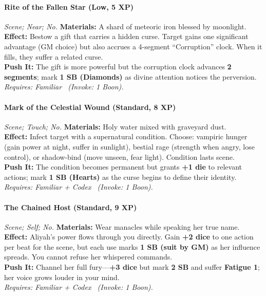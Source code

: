 \paragraph{Rite of the Fallen Star (Low, 5 XP)} \emph{Scene; Near; No.}
\textbf{Materials:} A shard of meteoric iron blessed by moonlight.\\
\textbf{Effect:} Bestow a gift that carries a hidden curse. Target gains one significant advantage (GM choice) but also accrues a 4-segment ``Corruption'' clock. When it fills, they suffer a related curse.\\
\textbf{Push It:} The gift is more powerful but the corruption clock advances \textbf{2 segments}; mark \textbf{1 SB (Diamonds)} as divine attention notices the perversion.\\
\emph{Requires: Familiar \ (\textit{Invoke:} 1 Boon).}

\paragraph{Mark of the Celestial Wound (Standard, 8 XP)} \emph{Scene; Touch; No.}
\textbf{Materials:} Holy water mixed with graveyard dust.\\
\textbf{Effect:} Infect target with a supernatural condition. Choose: vampiric hunger (gain power at night, suffer in sunlight), bestial rage (strength when angry, lose control), or shadow-bind (move unseen, fear light). Condition lasts scene.\\
\textbf{Push It:} The condition becomes permanent but grants \textbf{+1 die} to relevant actions; mark \textbf{1 SB (Hearts)} as the curse begins to define their identity.\\
\emph{Requires: Familiar + Codex \ (\textit{Invoke:} 1 Boon).}

\paragraph{The Chained Host (Standard, 9 XP)} \emph{Scene; Self; No.}
\textbf{Materials:} Wear manacles while speaking her true name.\\
\textbf{Effect:} Aliyah's power flows through you directly. Gain \textbf{+2 dice} to one action per beat for the scene, but each use marks \textbf{1 SB (suit by GM)} as her influence spreads. You cannot refuse her whispered commands.\\
\textbf{Push It:} Channel her full fury—\textbf{+3 dice} but mark \textbf{2 SB} and suffer \textbf{Fatigue 1}; her voice grows louder in your mind.\\
\emph{Requires: Familiar + Codex \ (\textit{Invoke:} 1 Boon).}

